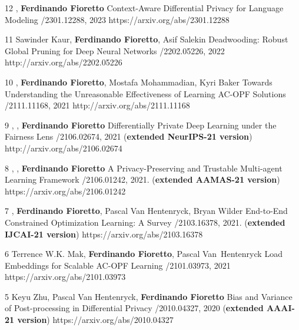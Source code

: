 \begin{pubs}

\wsentry 
	{12}%
	{, {\bf Ferdinando Fioretto}}
	{Context-Aware Differential Privacy for Language Modeling}
	{/2301.12288, 2023}
	{https://arxiv.org/abs/2301.12288}

\wsentry 
	{11}%
	{Sawinder Kaur, {\bf Ferdinando Fioretto}, Asif Salekin}
	{Deadwooding: Robust Global Pruning for Deep Neural Networks} 
	{/2202.05226, 2022}
	{http://arxiv.org/abs/2202.05226}

\wsentry 
	{10}%
	{, {\bf Ferdinando Fioretto}, Mostafa Mohammadian, Kyri Baker}
	{Towards Understanding the Unreasonable Effectiveness of Learning AC-OPF Solutions}
	{/2111.11168, 2021}
	{http://arxiv.org/abs/2111.11168}

\wsentry %
	{9}%
	{, , {\bf Ferdinando Fioretto}}
	{Differentially Private Deep Learning under the Fairness Lens}
	{/2106.02674, 2021 ({\bf extended NeurIPS-21 version})}
	{http://arxiv.org/abs/2106.02674}

\wsentry 
	{8}%
	{, , {\bf Ferdinando Fioretto}}
	{A Privacy-Preserving and Trustable Multi-agent Learning Framework}
	{/2106.01242, 2021. ({\bf extended AAMAS-21 version})}
	{https://arxiv.org/abs/2106.01242}

\wsentry %
	{7}%
	{, {\bf Ferdinando Fioretto}, Pascal Van Hentenryck, Bryan Wilder}
	{End-to-End Constrained Optimization Learning: A Survey}
	{/2103.16378, 2021. ({\bf extended IJCAI-21 version})}
	{https://arxiv.org/abs/2103.16378}

\wsentry 
	{6}%
	{Terrence W.K. Mak, {\bf Ferdinando Fioretto}, Pascal Van~Hentenryck}
	{Load Embeddings for Scalable AC-OPF Learning}
	{/2101.03973, 2021}
	{https://arxiv.org/abs/2101.03973}

\wsentry 
	{5}%
	{Keyu Zhu, Pascal Van Hentenryck, {\bf Ferdinando Fioretto}}
	{Bias and Variance of Post-processing in Differential Privacy}
	{/2010.04327, 2020 ({\bf extended AAAI-21 version})}
	{https://arxiv.org/abs/2010.04327}


\end{pubs}
